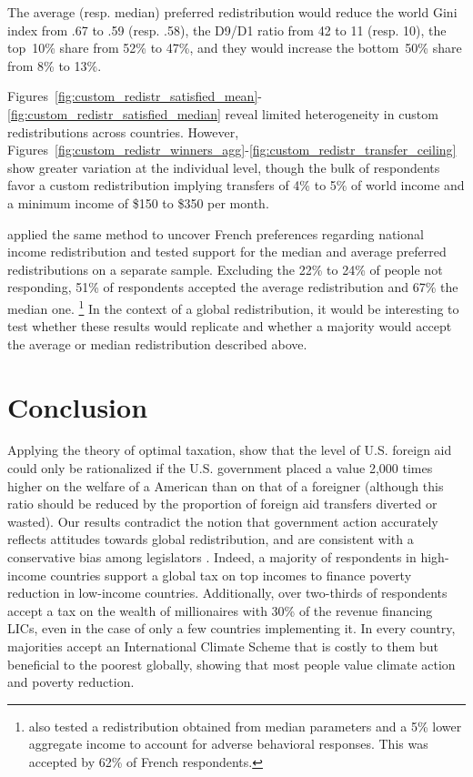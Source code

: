 \documentclass[12pt,english]{article}
\begin{document}
\begin{bibunit}
The average (resp. median) preferred redistribution would reduce the world Gini index from .67 to .59 (resp. .58), the D9/D1 ratio from 42 to 11 (resp. 10), the top~10\% share from 52\% to 47\%, and they would increase the bottom~50\% share from 8\% to 13\%.

Figures~\ref{fig:custom_redistr_satisfied_mean}-\ref{fig:custom_redistr_satisfied_median} reveal limited heterogeneity in custom redistributions across countries. However, Figures~\ref{fig:custom_redistr_winners_agg}-\ref{fig:custom_redistr_transfer_ceiling} show greater variation at the individual level, though the bulk of respondents favor a custom redistribution implying transfers of 4\% to 5\% of world income and a minimum income of \$150 to \$350 per month. 

\cite{fabre_french_2022} applied the same method to uncover French preferences regarding national income redistribution and tested support for the median and average %
preferred redistributions on a separate sample. Excluding the 22\% to 24\% of people not responding, 51\% of respondents accepted the average redistribution and 67\% the median one.%
\footnote{\cite{fabre_french_2022} also tested a redistribution obtained from median parameters and a 5\% lower aggregate income to account for adverse behavioral responses. This was accepted by 62\% of French respondents.} 
In the context of a global redistribution, it would be interesting to test whether these results would replicate and whether a majority would accept the average or median redistribution described above. 

\section{Conclusion} %

Applying the theory of optimal taxation, \cite{kopczuk_limitations_2005} show that the level of U.S. foreign aid could only be rationalized if the U.S. government placed a value 2,000 times higher on the welfare of a American than on that of a foreigner (although this ratio should be reduced by the proportion of foreign aid transfers diverted or wasted). 
Our results contradict the notion that government action accurately reflects attitudes towards global redistribution, and are consistent with a conservative bias among legislators \citep{gilens_testing_2014,broockman_bias_2018,pilet_politicians_2024}. 
Indeed, a majority of respondents in high-income countries support a global tax on top incomes to finance poverty reduction in low-income countries. Additionally, over two-thirds of respondents accept a tax on the wealth of millionaires with 30\% of the revenue financing LICs, even in the case of only a few countries implementing it. In every country, majorities accept an International Climate Scheme that is costly to them but beneficial to the poorest globally, showing that most people value climate action and poverty reduction. 


\end{bibunit}
\end{document}

